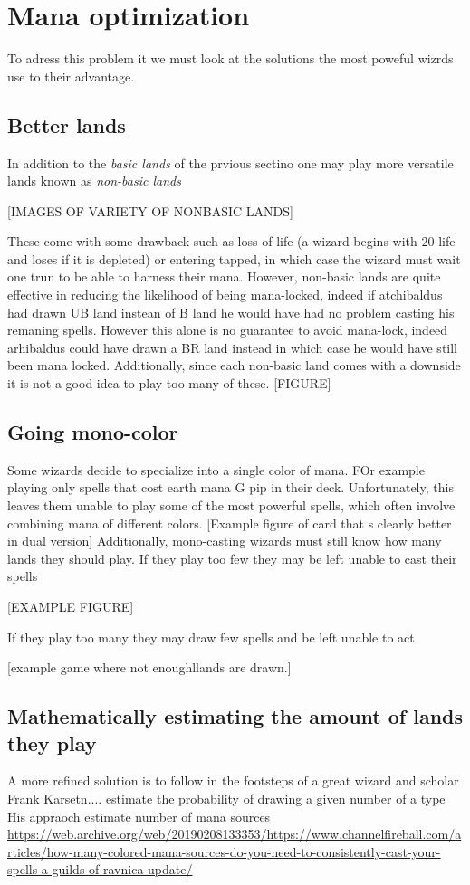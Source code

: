 \documentclass[
    a4paper,
    DIV=13,
    abstract=true,
    numbers=noenddot
]{scrartcl}
\begin{document}
\section{Mana optimization}
To adress this problem it we must look at the solutions the most poweful wizrds use to their advantage.
\subsection{Better lands}
In addition to the \emph{basic lands} of the prvious sectino one may play more versatile lands known as \emph{non-basic lands} 

[IMAGES OF VARIETY OF NONBASIC LANDS]

These come with some drawback such as loss of life (a wizard begins with $20$ life and loses if it is depleted) or entering tapped, in which case the wizard must wait one trun to be able to harness their mana. However, non-basic lands are quite effective in reducing the likelihood of being mana-locked, indeed if atchibaldus had drawn UB land instean of B land he would have had no problem casting his remaning spells. However this alone is no guarantee to avoid mana-lock, indeed arhibaldus could have drawn a BR land instead in which case he would have still been mana locked. Additionally, since each non-basic land comes with a downside it is not a good idea to play too many of these.
[FIGURE]
\subsection{Going mono-color}
Some wizards decide to specialize into a single color of mana. FOr example playing only spells that cost earth mana G pip in their deck. Unfortunately, this leaves them unable to play some of the most powerful spells, which often involve combining mana of different colors.
[Example figure of card that s clearly better in dual version]
Additionally, mono-casting wizards must still know how many lands they should play. If they play too few they may be left unable to cast their spells 

[EXAMPLE FIGURE]

If they play too many they may draw few spells and be left unable to act

[example game where not enoughllands are drawn.]


\subsection{Mathematically estimating the amount of lands they play}
A more refined solution is to follow in the footsteps of a great wizard and scholar Frank Karsetn....   estimate the probability of drawing a given number of a type
His appraoch  estimate number of mana sources \href{link}{https://web.archive.org/web/20190208133353/https://www.channelfireball.com/articles/how-many-colored-mana-sources-do-you-need-to-consistently-cast-your-spells-a-guilds-of-ravnica-update/}
\end{document}
